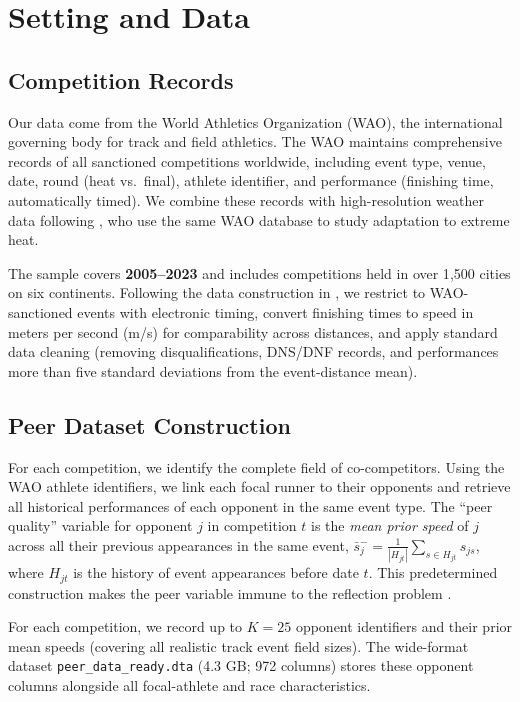 \documentclass[12pt]{article}
\theoremstyle{definition}
\theoremstyle{remark}
\begin{document}
\section{Setting and Data}
\label{sec:data}

\subsection{Competition Records}

Our data come from the World Athletics Organization (WAO), the international
governing body for track and field athletics.
The WAO maintains comprehensive records of all sanctioned competitions
worldwide, including event type, venue, date, round (heat vs.\ final),
athlete identifier, and performance (finishing time, automatically timed).
We combine these records with high-resolution weather data following
\citet{AragonRezazadeh2025}, who use the same WAO database to study
adaptation to extreme heat.

The sample covers \textbf{2005--2023} and includes competitions held in over
1{,}500 cities on six continents.
Following the data construction in \citet{AragonRezazadeh2025}, we restrict to
WAO-sanctioned events with electronic timing, convert finishing times to speed
in meters per second (m/s) for comparability across distances, and apply
standard data cleaning (removing disqualifications, DNS/DNF records, and
performances more than five standard deviations from the event-distance mean).

\subsection{Peer Dataset Construction}

For each competition, we identify the complete field of co-competitors.
Using the WAO athlete identifiers, we link each focal runner to their opponents
and retrieve all historical performances of each opponent in the same event type.
The ``peer quality'' variable for opponent $j$ in competition $t$ is the
\textit{mean prior speed} of $j$ across all their previous appearances in
the same event, $\bar{s}_j^- = \frac{1}{|H_{jt}|}\sum_{s \in H_{jt}} s_{js}$,
where $H_{jt}$ is the history of event appearances before date $t$.
This predetermined construction makes the peer variable immune to the
reflection problem \citep{Manski1993}.

For each competition, we record up to $K = 25$ opponent identifiers and their
prior mean speeds (covering all realistic track event field sizes).
The wide-format dataset \texttt{peer\_data\_ready.dta} (4.3 GB; 972 columns)
stores these opponent columns alongside all focal-athlete and race characteristics.
\end{document}
